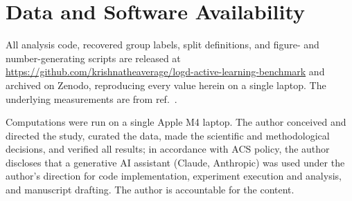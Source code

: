\documentclass[journal=acsodf,manuscript=article]{achemso}
\begin{document}
\section*{Data and Software Availability}
All analysis code, recovered group labels, split definitions, and figure- and
number-generating scripts are released at
\url{https://github.com/krishnatheaverage/logd-active-learning-benchmark} and archived
on Zenodo, reproducing every value herein on a single laptop. The underlying
measurements are from ref.~.

\begin{acknowledgement}
Computations were run on a single Apple M4 laptop. The author conceived and directed
the study, curated the data, made the scientific and methodological decisions, and
verified all results; in accordance with ACS policy, the author discloses that a
generative AI assistant (Claude, Anthropic) was used under the author's direction for
code implementation, experiment execution and analysis, and manuscript drafting. The
author is accountable for the content.
\end{acknowledgement}

\clearpage

\end{document}
